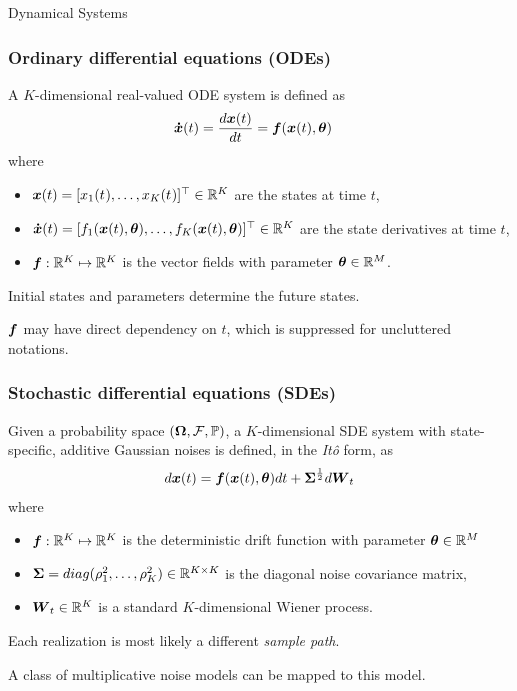 \begin{frame}
    \begin{center}
        {\large Dynamical Systems}
    \end{center}        
\end{frame}

\begin{frame}[t]
    \frametitle{Ordinary differential equations (ODEs)}
    A $K$-dimensional real-valued ODE system is defined as
    \begin{align}
        \boldsymbol{\dot{x}}(t) & = \frac{d\boldsymbol{x}(t)}{dt} = \boldsymbol{f}(\boldsymbol{x}(t), \boldsymbol{\theta})
    \label{eq-odes}
    \end{align}
    where
    \begin{itemize}
        \item[] $\boldsymbol{x}(t) = [x_{1}(t_{}),\dots,x_{K}(t_{})]^\top \in \mathbb{R}^K$ are the states at time $t$,
        \item[] $\boldsymbol{\dot{x}}(t) = [f_{1}(\boldsymbol{x}(t), \boldsymbol{\theta}),\dots,f_{K}(\boldsymbol{x}(t), \boldsymbol{\theta})]^\top \in \mathbb{R}^K$ are the  state derivatives at time $t$,
        \item[] $\boldsymbol{f}:\mathbb{R}^K \mapsto \mathbb{R}^K$ is the vector fields with parameter $\boldsymbol{\theta} \in \mathbb{R}^M$.
    \end{itemize}
    
    \vspace{\baselineskip}
    Initial states and parameters determine the future states.
        
    \vspace{1\baselineskip}
    {\footnotesize
        $\boldsymbol{f}$ may have direct dependency on $t$, which is suppressed for uncluttered notations.
    }
\end{frame}

\begin{frame}[t]
    \frametitle{Stochastic differential equations (SDEs)}
    Given a probability space $(\boldsymbol{\Omega}, \mathcal{F}, \mathbb{P})$, a $K$-dimensional SDE system with state-specific, additive Gaussian noises is defined, in the \emph{It\^{o}} form, as
    \begin{align}
        d\boldsymbol{x}(t) = \boldsymbol{f}(\boldsymbol{x}(t), \boldsymbol{\theta}) dt + \boldsymbol{\Sigma}^{\frac{1}{2}} d\boldsymbol{W}_t
        \label{eq-sdes}
    \end{align} 
    where
    \begin{itemize}
    	\item[] $\boldsymbol{f}: \mathbb{R}^K \mapsto \mathbb{R}^K$ is the deterministic drift function with parameter $\boldsymbol{\theta} \in \mathbb{R}^M$
        \item[] $\boldsymbol{\Sigma} = diag(\rho_1^2,\dots,\rho_K^2) \in \mathbb{R}^{K \times K}$ is the diagonal noise covariance matrix,
        \item[] $\boldsymbol{W}_t \in \mathbb{R}^{K}$ is a standard $K$-dimensional Wiener process.
    \end{itemize}
    
    \vspace{\baselineskip}
    Each realization is most likely a different \emph{sample path}.
    
    \vspace{\baselineskip}
    A class of multiplicative noise models can be mapped to this model.
\end{frame}

